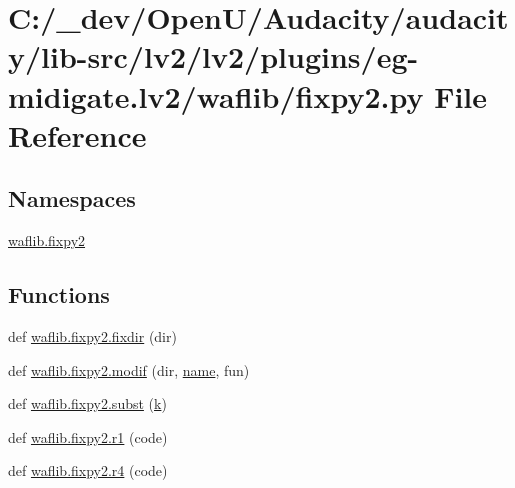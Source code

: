 \hypertarget{lv2_2plugins_2eg-midigate_8lv2_2waflib_2fixpy2_8py}{}\section{C\+:/\+\_\+dev/\+Open\+U/\+Audacity/audacity/lib-\/src/lv2/lv2/plugins/eg-\/midigate.lv2/waflib/fixpy2.py File Reference}
\label{lv2_2plugins_2eg-midigate_8lv2_2waflib_2fixpy2_8py}
\subsection*{Namespaces}
\begin{DoxyCompactItemize}
\item 
 \hyperlink{namespacewaflib_1_1fixpy2}{waflib.\+fixpy2}
\end{DoxyCompactItemize}
\subsection*{Functions}
\begin{DoxyCompactItemize}
\item 
def \hyperlink{namespacewaflib_1_1fixpy2_ab553b609bb1e5be9704eaa0018947909}{waflib.\+fixpy2.\+fixdir} (dir)
\item 
def \hyperlink{namespacewaflib_1_1fixpy2_a4c821ce0a3eff8e4ccbbf9daa9648270}{waflib.\+fixpy2.\+modif} (dir, \hyperlink{lib_2expat_8h_a1b49b495b59f9e73205b69ad1a2965b0}{name}, fun)
\item 
def \hyperlink{namespacewaflib_1_1fixpy2_a5f7f3e2b61180292e779e171dc5a1dbf}{waflib.\+fixpy2.\+subst} (\hyperlink{rfft2d_test_m_l_8m_adc468c70fb574ebd07287b38d0d0676d}{k})
\item 
def \hyperlink{namespacewaflib_1_1fixpy2_a721a8f58a4734bba827b4f6d985f98ff}{waflib.\+fixpy2.\+r1} (code)
\item 
def \hyperlink{namespacewaflib_1_1fixpy2_a3e64c393bc3c2aacf327ab18d56dd7ef}{waflib.\+fixpy2.\+r4} (code)
\end{DoxyCompactItemize}
